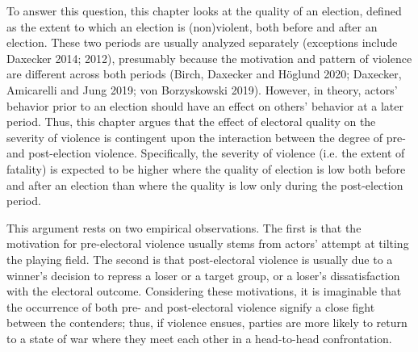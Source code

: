 \documentclass [11pt]{article}
\begin{document}
To answer this question, this chapter looks at the quality of an election, defined as the extent to which an election is (non)violent, both before and after an election. These two periods are usually analyzed separately (exceptions include Daxecker 2014; 2012), presumably because the motivation and pattern of violence are different across both periods (Birch, Daxecker and Höglund 2020; Daxecker, Amicarelli and Jung 2019; von Borzyskowski 2019). However, in theory, actors' behavior prior to an election should have an effect on others' behavior at a later period. Thus, this chapter argues that the effect of electoral quality on the severity of violence is contingent upon the interaction between the degree of pre- and post-election violence. Specifically, the severity of violence (i.e. the extent of fatality) is expected to be higher where the quality of election is low both before and after an election than where the quality is low only during the post-election period.

This argument rests on two empirical observations. The first is that the motivation for pre-electoral violence usually stems from actors' attempt at tilting the playing field. The second is that post-electoral violence is usually due to a winner's decision to repress a loser or a target group, or a loser's dissatisfaction with the electoral outcome. Considering these motivations, it is imaginable that the occurrence of both pre- and post-electoral violence signify a close fight between the contenders; thus, if violence ensues, parties are more likely to return to a state of war where they meet each other in a head-to-head confrontation.
\end{document}
